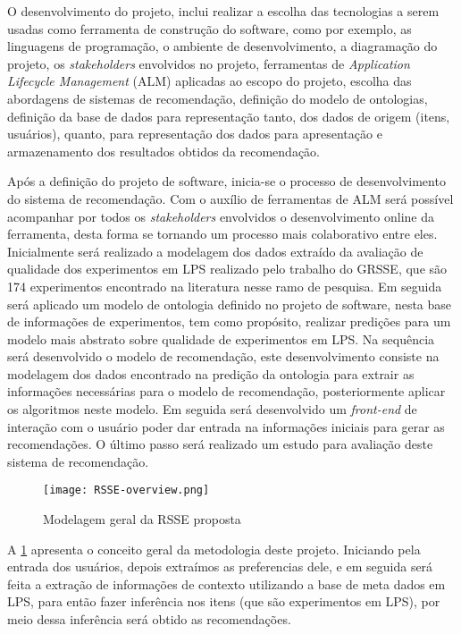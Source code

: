 O desenvolvimento do projeto, inclui realizar a escolha das tecnologias a serem usadas como ferramenta de construção do software, como por exemplo, as linguagens de programação, o ambiente de desenvolvimento, a diagramação do projeto, os \textit{stakeholders} envolvidos no projeto, ferramentas de \textit{Application Lifecycle Management} (ALM) aplicadas ao escopo do projeto, escolha das abordagens de sistemas de recomendação, definição do modelo de ontologias, definição da base de dados para representação tanto, dos dados de origem (itens, usuários), quanto, para representação dos dados para apresentação e armazenamento dos resultados obtidos da recomendação. 

Após a definição do projeto de software, inicia-se o processo de desenvolvimento do sistema de recomendação. Com o auxílio de ferramentas de ALM será possível acompanhar por todos os \textit{stakeholders} envolvidos o desenvolvimento online da ferramenta, desta forma se tornando um processo mais colaborativo entre eles. Inicialmente será realizado a modelagem dos dados extraído da avaliação de qualidade dos experimentos em LPS realizado pelo trabalho do GRSSE, que são 174 experimentos encontrado na literatura nesse ramo de pesquisa. Em seguida será aplicado um modelo de ontologia definido no projeto de software, nesta base de informações de experimentos, tem como propósito, realizar predições para um modelo mais abstrato sobre qualidade de experimentos em LPS. Na sequência será desenvolvido o modelo de recomendação, este desenvolvimento consiste na modelagem dos dados encontrado na predição da ontologia para extrair as informações necessárias para o modelo de recomendação, posteriormente aplicar os algoritmos neste modelo. Em seguida será desenvolvido um \textit{front-end} de interação com o usuário poder dar entrada na informações iniciais para gerar as recomendações. O último passo será realizado um estudo para avaliação deste sistema de recomendação.

\begin{figure}[htb]
	\centering					
	{\texttt{[image: RSSE-overview.png]}}
	
	\caption{Modelagem geral da RSSE proposta}
	\label{fig:RSSE-overview}
\end{figure}

A \ref{fig:RSSE-overview} apresenta o conceito geral da metodologia deste projeto. Iniciando pela entrada dos usuários, depois extraímos as preferencias dele, e em seguida será feita a extração de informações de contexto utilizando a base de meta dados em LPS, para então fazer inferência nos itens (que são experimentos em LPS), por meio dessa inferência será obtido as recomendações.


